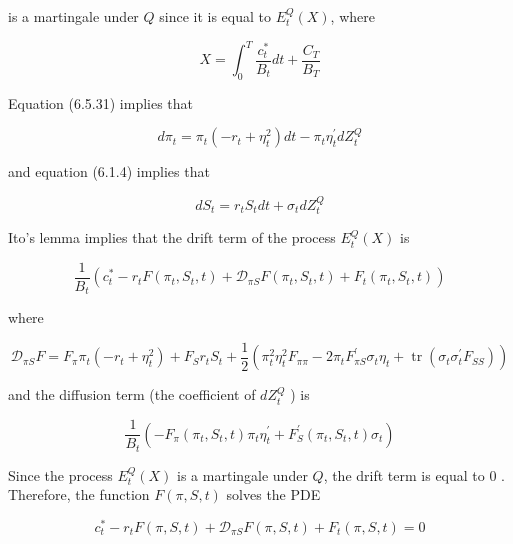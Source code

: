 \documentclass[\topdir/lecture\_notes.tex]{subfiles}
\begin{document}
is a martingale under \(Q\) since it is equal to \(E_{t}^{Q}(X)\), where

\begin{equation}
X=\int_{0}^{T} \frac{c_{t}^{*}}{B_{t}} d t+\frac{C_{T}}{B_{T}}
\end{equation}

Equation (6.5.31) implies that

\begin{equation}
d \pi_{t}=\pi_{t}\left(-r_{t}+\eta_{t}^{2}\right) d t-\pi_{t} \eta_{t}^{\prime} d Z_{t}^{Q}
\end{equation}

and equation (6.1.4) implies that

\begin{equation}
d S_{t}=r_{t} S_{t} d t+\sigma_{t} d Z_{t}^{Q}
\end{equation}

Ito's lemma implies that the drift term of the process \(E_{t}^{Q}(X)\) is

\begin{equation}
\frac{1}{B_{t}}\left(c_{t}^{*}-r_{t} F\left(\pi_{t}, S_{t}, t\right)+\mathcal{D}_{\pi S} F\left(\pi_{t}, S_{t}, t\right)+F_{t}\left(\pi_{t}, S_{t}, t\right)\right)
\end{equation}

where

\begin{equation}
\mathcal{D}_{\pi S} F=F_{\pi} \pi_{t}\left(-r_{t}+\eta_{t}^{2}\right)+F_{S} r_{t} S_{t}+\frac{1}{2}\left(\pi_{t}^{2} \eta_{t}^{2} F_{\pi \pi}-2 \pi_{t} F_{\pi S}^{\prime} \sigma_{t} \eta_{t}+\operatorname{tr}\left(\sigma_{t} \sigma_{t}^{\prime} F_{S S}\right)\right)
\end{equation}

and the diffusion term (the coefficient of \(d Z_{t}^{Q}\) ) is

\begin{equation}
\frac{1}{B_{t}}\left(-F_{\pi}\left(\pi_{t}, S_{t}, t\right) \pi_{t} \eta_{t}^{\prime}+F_{S}^{\prime}\left(\pi_{t}, S_{t}, t\right) \sigma_{t}\right)
\end{equation}

Since the process \(E_{t}^{Q}(X)\) is a martingale under \(Q\), the drift term is equal to 0 . Therefore, the function \(F(\pi, S, t)\) solves the PDE

\begin{equation}
c_{t}^{*}-r_{t} F(\pi, S, t)+\mathcal{D}_{\pi S} F(\pi, S, t)+F_{t}(\pi, S, t)=0 \label{eq:6.5.32}
\end{equation}
\end{document}
